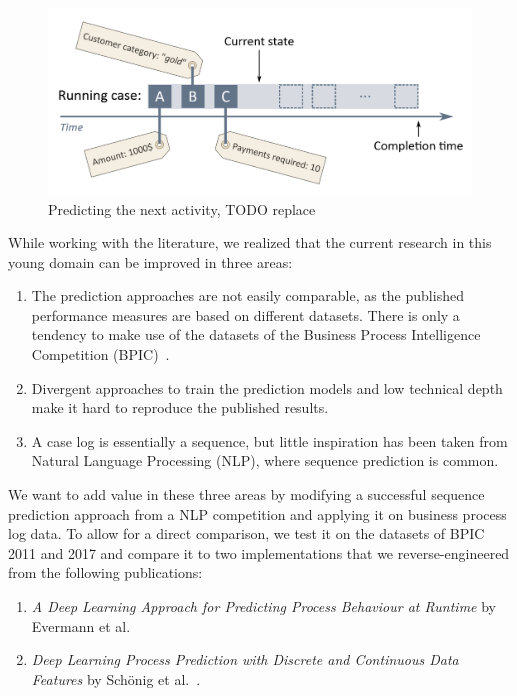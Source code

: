 \begin{figure}
    \centering
    \includegraphics[width=\textwidth]{gfx/next-activity.png}
    \caption{Predicting the next activity, TODO replace}
    \label{fig:next-activity-prediction}
\end{figure}

While working with the literature, we realized that the current research in this young domain can be improved in three areas:

\begin{enumerate}
    \item The prediction approaches are not easily comparable, as the published performance measures are based on different datasets. There is only a tendency to make use of the datasets of the Business Process Intelligence Competition (BPIC)~\cite{BPIC2011, BPIC2012, BPIC2017}.
    \item Divergent approaches to train the prediction models and low technical depth make it hard to reproduce the published results.
    \item A case log is essentially a sequence, but little inspiration has been taken from Natural Language Processing (NLP), where sequence prediction is common.
\end{enumerate}

We want to add value in these three areas by modifying a successful sequence prediction approach from a NLP competition and applying it on business process log data. To allow for a direct comparison, we test it on the datasets of BPIC 2011 and 2017 and compare it to two implementations that we reverse-engineered from the following publications:

\begin{enumerate}
    \item \textit{A Deep Learning Approach for Predicting Process Behaviour at Runtime} by Evermann et al.~\cite{evermann2016} \item\textit{Deep Learning Process Prediction with Discrete and Continuous Data Features} by Schönig et al.~\cite{schoenig2018}.
\end{enumerate}

